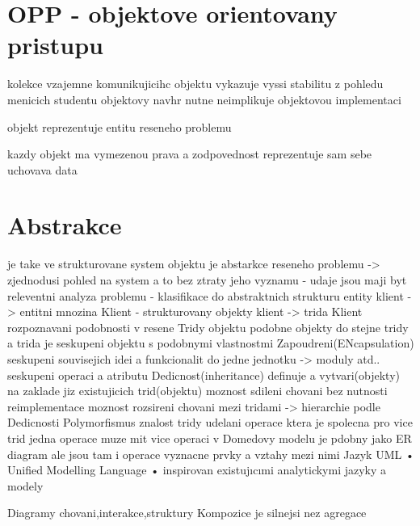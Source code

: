 \documentclass{article}
\begin{document}
\sloppy
\section{OPP - objektove orientovany pristupu}
kolekce vzajemne komunikujicihc objektu
vykazuje vyssi stabilitu z pohledu menicich studentu
objektovy navhr nutne neimplikuje objektovou implementaci

objekt reprezentuje entitu reseneho problemu

kazdy objekt ma vymezenou prava a zodpovednost
reprezentuje sam sebe
uchovava data

\section{Abstrakce}
je take ve strukturovane
system objektu je abstarkce reseneho problemu -> zjednodusi pohled na system
a to bez ztraty jeho vyznamu - udaje jsou maji byt releventni
analyza problemu - klasifikace do abstraktnich strukturu
entity klient -> entitni mnozina Klient - strukturovany
objekty klient -> trida Klient
rozpoznavani podobnosti v resene
Tridy objektu
    podobne objekty do stejne tridy
    a trida je seskupeni objektu s podobnymi vlastnostmi
Zapoudreni(ENcapsulation)
    seskupeni souvisejich idei a funkcionalit do jedne jednotku -> moduly atd..
   seskupeni operaci a atributu
Dedicnost(inheritance)
definuje a vytvari(objekty) na zaklade jiz existujicich trid(objektu)
 moznost sdileni chovani bez nutnosti reimplementace
 moznost rozsireni chovani
mezi tridami -> hierarchie podle Dedicnosti
Polymorfismus
    znalost tridy udelani operace ktera je spolecna pro vice trid
    jedna operace muze mit vice operaci
v Domedovy modelu
    je pdobny jako ER diagram ale jsou tam i operace
    vyznacne prvky a vztahy mezi nimi
Jazyk UML
• Unified Modelling Language
• inspirovan existujıcımi analytickymi jazyky a modely

Diagramy chovani,interakce,struktury
Kompozice je silnejsi nez agregace
\end{document}

